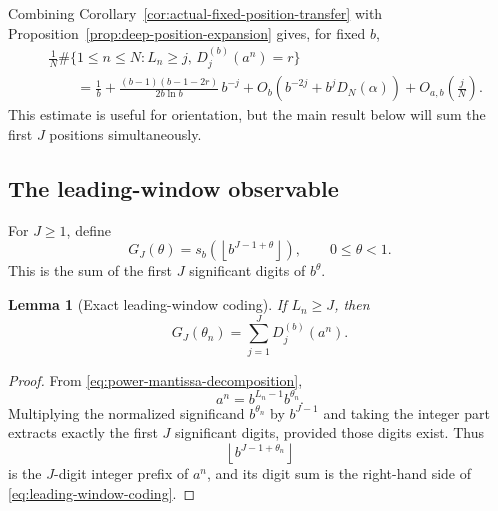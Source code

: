 \documentclass[11pt]{article}
\newtheorem{lemma}[theorem]{Lemma}
\theoremstyle{definition}
\theoremstyle{remark}
\begin{document}
Combining
Corollary~\ref{cor:actual-fixed-position-transfer} with
Proposition~\ref{prop:deep-position-expansion} gives, for fixed \(b\),
\begin{equation}
\begin{aligned}
    &\frac1N
    \#\{
        1\le n\le N:
        L_n\ge j,\,
        D_j^{(b)}(a^n)=r
    \}
    \\
    &\qquad=
    \frac1b
    +
    \frac{(b-1)(b-1-2r)}
         {2b\ln b}\,b^{-j}
    +
O_b\!\left(
    b^{-2j}
    +
    b^jD_N(\alpha)
\right)
+
O_{a,b}\!\left(\frac{j}{N}\right).
    \label{eq:fixed-position-combined}
\end{aligned}
\end{equation}
This estimate is useful for orientation, but the main result below
will sum the first \(J\) positions simultaneously.


\subsection{The leading-window observable}
\label{subsec:leading-window-observable}

For \(J\ge1\), define
\begin{equation}
    G_J(\theta)
    =
    s_b
    \left(
        \left\lfloor
            b^{J-1+\theta}
        \right\rfloor
    \right),
    \qquad
    0\le\theta<1.
    \label{eq:G-J-definition}
\end{equation}
This is the sum of the first \(J\) significant digits of \(b^\theta\).

\begin{lemma}[Exact leading-window coding]
\label{lem:leading-window-coding}
If \(L_n\ge J\), then
\begin{equation}
\boxed{
    G_J(\theta_n)
    =
    \sum_{j=1}^{J}
    D_j^{(b)}(a^n).
}
\label{eq:leading-window-coding}
\end{equation}
\end{lemma}

\begin{proof}
From
\eqref{eq:power-mantissa-decomposition},
\[
    a^n
    =
    b^{L_n-1}b^{\theta_n}.
\]
Multiplying the normalized significand \(b^{\theta_n}\) by
\(b^{J-1}\) and taking the integer part extracts exactly the first
\(J\) significant digits, provided those digits exist.  Thus
\[
    \left\lfloor
        b^{J-1+\theta_n}
    \right\rfloor
\]
is the \(J\)-digit integer prefix of \(a^n\), and its digit sum is
the right-hand side of
\eqref{eq:leading-window-coding}.
\end{proof}
\end{document}
